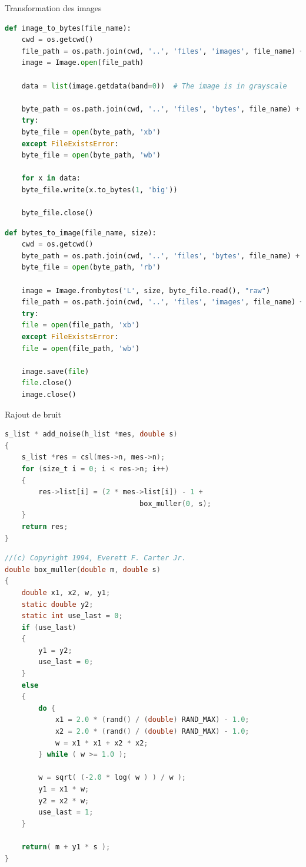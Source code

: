 \documentclass[11pt]{beamer}
\begin{document}
\begin{frame}{Transformation des images}
	\begin{lstlisting}[language=Python]
def image_to_bytes(file_name):
	cwd = os.getcwd()
	file_path = os.path.join(cwd, '..', 'files', 'images', file_name) + '.png'
	image = Image.open(file_path)
	
	data = list(image.getdata(band=0))  # The image is in grayscale
	
	byte_path = os.path.join(cwd, '..', 'files', 'bytes', file_name) + '.bt'
	try:
	byte_file = open(byte_path, 'xb')
	except FileExistsError:
	byte_file = open(byte_path, 'wb')
	
	for x in data:
	byte_file.write(x.to_bytes(1, 'big'))
	
	byte_file.close()
	\end{lstlisting}
\end{frame}

\begin{frame}
	\begin{lstlisting}[language=Python]
def bytes_to_image(file_name, size):
	cwd = os.getcwd()
	byte_path = os.path.join(cwd, '..', 'files', 'bytes', file_name) + '.bt'
	byte_file = open(byte_path, 'rb')
	
	image = Image.frombytes('L', size, byte_file.read(), "raw")
	file_path = os.path.join(cwd, '..', 'files', 'images', file_name) + '.png'
	try:
	file = open(file_path, 'xb')
	except FileExistsError:
	file = open(file_path, 'wb')
	
	image.save(file)
	file.close()
	image.close()	
	\end{lstlisting}
\end{frame}

\begin{frame}{Rajout de bruit}
	\begin{lstlisting}[language=C]
s_list * add_noise(h_list *mes, double s)
{
	s_list *res = csl(mes->n, mes->n);
	for (size_t i = 0; i < res->n; i++)
	{
		res->list[i] = (2 * mes->list[i]) - 1 + 
								box_muller(0, s);
	}
	return res;
}
	\end{lstlisting}
\end{frame}

\begin{frame}
	\begin{lstlisting}[language=C]
//(c) Copyright 1994, Everett F. Carter Jr.
double box_muller(double m, double s)
{
	double x1, x2, w, y1;
	static double y2;
	static int use_last = 0;
	if (use_last)
	{
		y1 = y2;
		use_last = 0;
	}
	else
	{
		do {
			x1 = 2.0 * (rand() / (double) RAND_MAX) - 1.0;
			x2 = 2.0 * (rand() / (double) RAND_MAX) - 1.0;
			w = x1 * x1 + x2 * x2;
		} while ( w >= 1.0 );
		
		w = sqrt( (-2.0 * log( w ) ) / w );
		y1 = x1 * w;
		y2 = x2 * w;
		use_last = 1;
	}
	
	return( m + y1 * s );
}
	\end{lstlisting}
\end{frame}
\end{document}
